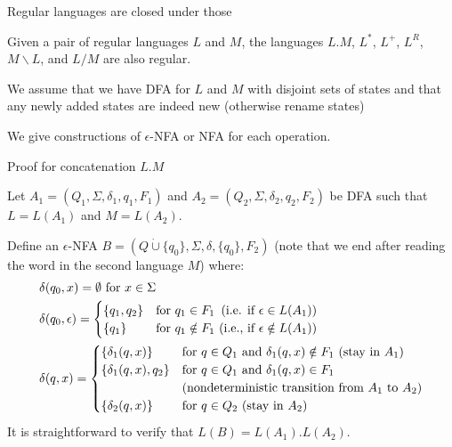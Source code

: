 \documentclass[handout]{beamer}
\begin{document}
\begin{frame}{Regular languages are closed under those}

    \begin{theorem}
        Given a pair of regular languages $L$ and $M$, the languages $L.M$, $L^*$, $L^+$, $L^R$, $M\backslash L$, and $L/M$ are also regular.
    \end{theorem}

    We assume that we have DFA for $L$ and $M$ with disjoint sets of states and that any newly added states are indeed new (otherwise rename states)

    We give constructions of $\epsilon$-NFA or NFA for each operation.

\end{frame}


\begin{frame}{Proof for concatenation $L.M$}

    Let $A_1=(Q_1,\Sigma, \delta_1,q_1,F_1)$ and $A_2=(Q_2,\Sigma, \delta_2,q_2,F_2)$ be DFA such that $L=L(A_1)$ and $M=L(A_2)$.
    
    Define an $\epsilon$-NFA $B=(Q\mathbin{\dot\cup} \{q_0\},\Sigma,\delta,\{q_0\},F_2)$ (note that we end after reading the word in the second language $M$) where:
    \begin{align*}
    &\delta(q_0,x)=\emptyset\text{ for }x\in \Sigma\\
    &\delta(q_0,\epsilon)=\begin{cases}
    \{q_1,q_2\}&\text{for }q_1\in F_1\hfill\text{ (i.e. if $\epsilon\in L(A_1)$)}\\
    \{q_1\}&\text{for }q_1\notin F_1\hfill\text{ (i.e., if $\epsilon \notin L(A_1)$)}
    \end{cases}\\
    &\delta(q,x)=
    \begin{cases}
    \{\delta_1(q,x)\}&\text{for $q\in Q_1$ and $\delta_1(q,x)\notin F_1$ (stay in $A_1$)}\\
    \{\delta_1(q,x),q_2\}&\text{for $q\in Q_1$ and $\delta_1(q,x)\in F_1$} \\ & \text{(nondeterministic transition from $A_1$ to $A_2$)}\\
    \{\delta_2(q,x)\}&\text{for $q\in Q_2$  (stay in $A_2$)}
    \end{cases}
    \end{align*}
    It is straightforward to verify that $L(B)=L(A_1).L(A_2)$.\hfill\qedsymbol

\end{frame}
\end{document}

